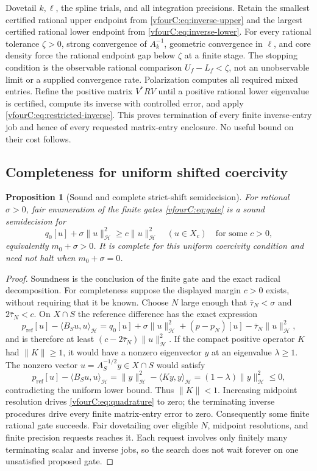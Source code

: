 \documentclass[11pt,a4paper]{article}
\numberwithin{equation}{section}
\newtheorem{proposition}[theorem]{Proposition}
\theoremstyle{definition}\newtheorem{definition}[theorem]{Definition}
\theoremstyle{remark}\newtheorem{remark}[theorem]{Remark}
\newcommand{\Hh}{\mathcal H}\newcommand{\Hw}{\mathcal H}
\newcommand{\ip}[2]{\langle#1,#2\rangle}\newcommand{\norm}[1]{\lVert#1\rVert}\newcommand{\abs}[1]{\lvert#1\rvert}
\begin{document}
Dovetail $k,\ell$, the spline trials, and all integration precisions.  Retain the
smallest certified rational upper endpoint from
\eqref{vfourC:eq:inverse-upper} and the largest certified rational lower endpoint
from \eqref{vfourC:eq:inverse-lower}.  For every rational tolerance $\zeta>0$,
strong convergence of $A_k^{-1}$, geometric convergence in $\ell$, and core
density force the rational endpoint gap below $\zeta$ at a finite stage.
The stopping condition is the observable rational comparison
$U_f-L_f<\zeta$, not an unobservable limit or a supplied convergence rate.
Polarization computes all required mixed entries.  Refine the positive matrix
$V^*RV$ until a positive rational lower eigenvalue is certified, compute its
inverse with controlled error, and apply \eqref{vfourC:eq:restricted-inverse}.
This proves termination of every finite inverse-entry job and hence of every
requested matrix-entry enclosure.  No useful bound on their cost follows.

\subsection{Completeness for uniform shifted coercivity}
\label{vfourC:subsec:coercivity}

\begin{proposition}[Sound and complete strict-shift semidecision]
\label{vfourC:prop:strict-shift}
For rational $\sigma>0$, fair enumeration of the finite gates
\eqref{vfourC:eq:gate} is a sound semidecision for
\[
 q_0[u]+\sigma\norm u_{\Hh}^2\ge c\norm u_{\Hh}^2
       \quad(u\in X_c)\quad\text{for some }c>0,
\]
equivalently $m_0+\sigma>0$.  It is complete for this \emph{uniform} coercivity
condition and need not halt when $m_0+\sigma=0$.
\end{proposition}
\begin{proof}
Soundness is the conclusion of the finite gate and the exact radical
decomposition.  For completeness suppose the displayed margin $c>0$ exists,
without requiring that it be known.  Choose $N$ large enough that
$\bar\tau_N<\sigma$ and $2\bar\tau_N<c$.  On $X\cap S$ the reference difference
has the exact expression
\[
 p_{\mathrm{ref}}[u]-\ip{B_Su}{u}_{\Hh}
   =q_0[u]+\sigma\norm u_{\Hh}^2
       +(p-p_N)[u]-\bar\tau_N\norm u_{\Hh}^2,
\]
and is therefore at least $(c-2\bar\tau_N)\norm u_{\Hh}^2$.
If the compact positive operator $K$ had $\norm K\ge1$, it would have a
nonzero eigenvector $y$ at an eigenvalue $\lambda\ge1$.  The nonzero vector
$u=A_S^{-1/2}y\in X\cap S$ would satisfy
\[
 p_{\mathrm{ref}}[u]-\ip{B_Su}{u}_{\Hh}
      =\norm y_{\Hh}^2-\ip{Ky}{y}_{\Hh}
      =(1-\lambda)\norm y_{\Hh}^2\le0,
\]
contradicting the uniform lower bound.  Thus $\norm K<1$.  Increasing midpoint
resolution drives \eqref{vfourC:eq:quadrature} to zero; the terminating inverse
procedures drive every finite matrix-entry error to zero.  Consequently some
finite rational gate succeeds.  Fair dovetailing over eligible $N$, midpoint
resolutions, and finite precision requests reaches it.  Each request involves
only finitely many terminating scalar and inverse jobs, so the search does not
wait forever on one unsatisfied proposed gate.
\end{proof}
\end{document}
